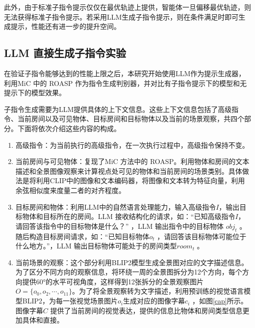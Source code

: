 \documentclass[bachelor]{thesis-uestc}
\begin{document}
此外，由于标准子指令提示仅仅在最优轨迹上提供，智能体一旦偏移最优轨迹，则无法获得标准子指令提示。若采用LLM生成子指令提示，则在条件满足时即可生成提示，性能还有进一步的提升空间。

\subsection{LLM 直接生成子指令实验}

在验证子指令能够达到的性能上限之后，本研究开始使用LLM作为提示生成器，利用MiC 中的 ROASP 作为指令生成判别器，并对比有子指令提示下的模型和无提示下的模型效果。

子指令生成需要为LLM提供具体的上下文信息。这些上下文信息包括了高级指令、当前房间以及可见物体、目标房间和目标物体以及当前的场景观察，共四个部分。下面将依次介绍这些内容的构成。

\begin{enumerate}
    \item 高级指令：为当前执行的高级指令，在一次执行过程中，高级指令保持不变。
    \item 当前房间与可见物体：复现了MiC 方法中的 ROASP。利用物体和房间的文本描述和全景图像观察来计算视点处可见的物体和当前房间的场景类别。具体做法是将利用CLIP中的图像和文本编码器，将图像和文本转为特征向量，利用余弦相似度来度量二者的对齐程度。
    \item 目标房间和物体：利用LLM中的自然语言处理能力，输入高级指令$I$，输出目标物体和目标所在的房间。LLM 接收结构化的请求，如：“已知高级指令$I$，请回答该指令中的目标物体是什么？” ，LLM 输出指令中的目标物体 $obj_t$ 。随后构造目标房间请求，如：“已知目标物体$o_t$ ，请回答该目标物体可能位于什么地方。”，LLM 输出目标物体可能处于的房间类型$room_t$ 。
    \item 当前场景的观察：这个部分利用BLIP2模型生成全景图对应的文字描述信息。为了区分不同方向的观察信息，将环绕一周的全景图拆分为12个方向，每个方向提供60°的水平可视角度，这样得到12张拆分的全景观察图片$O=\{o_0,o_2,\cdots,o_{11}\}$。为了将全景观察转为文字描述，利用预训练的视觉语言模型BLIP2，为每一张视觉场景图片$o_i$生成对应的图像字幕$c_i$ ，如图\ref{cap}所示。图像字幕$C$ 提供了当前房间的视觉表达，提供的信息比物体和房间类型信息更加具体和直接。
\end{enumerate}
\end{document}
